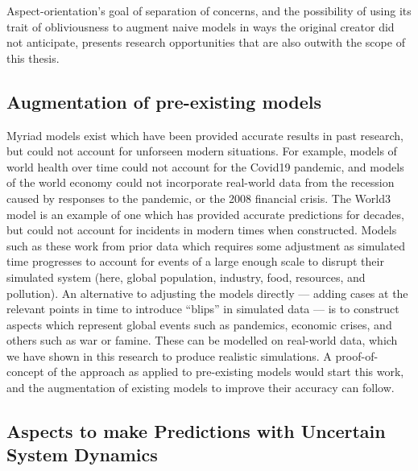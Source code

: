 Aspect-orientation's goal of separation of concerns, and the possibility of
using its trait of obliviousness to augment naive models in ways the original
creator did not anticipate, presents research opportunities that are also
outwith the scope of this thesis.

\subsection{Augmentation of pre-existing models}

Myriad models exist which have been provided accurate results in past research,
but could not account for unforseen modern situations. For example, models of
world health over time could not account for the Covid19 pandemic, and models of
the world economy could not incorporate real-world data from the recession
caused by responses to the pandemic, or the 2008 financial crisis. The World3
model is an example of one which has provided accurate predictions for decades,
but could not account for incidents in modern times when constructed. Models
such as these work from prior data which requires some adjustment as simulated
time progresses to account for events of a large enough scale to disrupt their
simulated system (here, global population, industry, food, resources, and
pollution). An alternative to adjusting the models directly --- adding cases at
the relevant points in time to introduce ``blips'' in simulated data --- is to
construct aspects which represent global events such as pandemics, economic
crises, and others such as war or famine. These can be modelled on real-world
data, which we have shown in this research to produce realistic simulations. A
proof-of-concept of the approach as applied to pre-existing models would start
this work, and the augmentation of existing models to improve their accuracy can
follow.
    

\subsection{Aspects to make Predictions with Uncertain System Dynamics}

